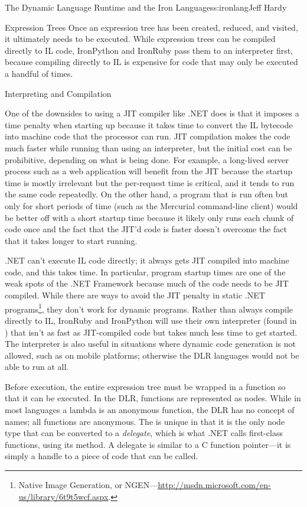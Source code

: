 \begin{aosachapter}{The Dynamic Language Runtime and the Iron Languages}{s:ironlang}{Jeff Hardy}
\begin{aosasect1}{Expression Trees}
Once an expression tree has been created, reduced, and visited, it ultimately needs to be executed. While expression trees can be compiled directly to IL code, IronPython and IronRuby pass them to an interpreter first, because compiling directly to IL is expensive for code that may only be executed a handful of times.

\end{aosasect1}

\begin{aosasect1}{Interpreting and Compilation}

One of the downsides to using a JIT compiler like .NET does is that it imposes a time penalty when starting up because it takes time to convert the IL bytecode into machine code that the processor can run. JIT compilation makes the code much faster while running than using an interpreter, but the initial cost can be prohibitive, depending on what is being done. For example, a long-lived server process such as a web application will benefit from the JIT because the startup time is mostly irrelevant but the per-request time is critical, and it tends to run the same code repeatedly. On the other hand, a program that is run often but only for short periods of time (such as the Mercurial command-line client) would be better off with a short startup time because it likely only runs each chunk of code once and the fact that the JIT'd code is faster doesn't overcome the fact that it takes longer to start running.

.NET can't execute IL code directly; it always gets JIT compiled into machine code, and this takes time. In particular, program startup times are one of the weak spots of the .NET Framework because much of the code needs to be JIT compiled. While there are ways to avoid the JIT penalty in static .NET programs\footnote{Native Image Generation, or NGEN---\url{http://msdn.microsoft.com/en-us/library/6t9t5wcf.aspx}.}, they don't work for dynamic programs. Rather than always compile directly to IL, IronRuby and IronPython will use their own interpreter (found in ) that isn't as fast as JIT-compiled code but takes much less time to get started. The interpreter is also useful in situations where dynamic code generation is not allowed, such as on mobile platforms; otherwise the DLR languages would not be able to run at all.

Before execution, the entire expression tree must be wrapped in a function so that it can be executed. In the DLR, functions are represented as  nodes. While in most languages a lambda is an anonymous function, the DLR has no concept of names; all functions are anonymous. The  is unique in that it is the only node type that can be converted to a \emph{delegate}, which is what .NET calls first-class functions, using its  method. A delegate is similar to a C function pointer---it is simply a handle to a piece of code that can be called.


\end{aosasect1}
\end{aosachapter}
